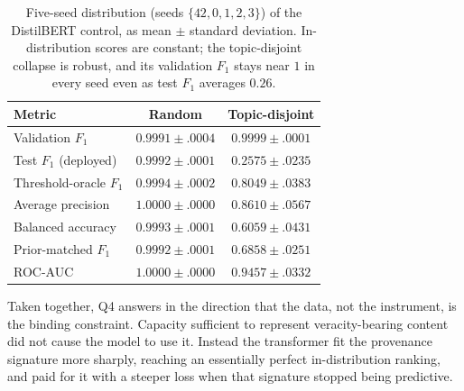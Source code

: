 \documentclass[conference]{IEEEtran}
\newcommand{\Fone}{$F_1$}
\begin{document}
\begin{table}[t]
\centering
\caption{Five-seed distribution (seeds $\{42,0,1,2,3\}$) of the DistilBERT
control, as mean $\pm$ standard deviation. In-distribution scores are constant;
the topic-disjoint collapse is robust, and its validation \Fone{} stays near $1$
in every seed even as test \Fone{} averages $0.26$.}
\label{tab:multiseed}
\footnotesize
\setlength{\tabcolsep}{3.4pt}
\begin{tabular}{@{}lcc@{}}
\toprule
Metric & Random & Topic-disjoint\\
\midrule
Validation \Fone{}          & $0.9991 \pm .0004$ & $0.9999 \pm .0001$\\
Test \Fone{} (deployed)     & $0.9992 \pm .0001$ & $0.2575 \pm .0235$\\
Threshold-oracle \Fone{}    & $0.9994 \pm .0002$ & $0.8049 \pm .0383$\\
Average precision           & $1.0000 \pm .0000$ & $0.8610 \pm .0567$\\
Balanced accuracy           & $0.9993 \pm .0001$ & $0.6059 \pm .0431$\\
Prior-matched \Fone{}       & $0.9992 \pm .0001$ & $0.6858 \pm .0251$\\
ROC-AUC                     & $1.0000 \pm .0000$ & $0.9457 \pm .0332$\\
\bottomrule
\end{tabular}
\end{table}

Taken together, Q4 answers in the direction that the data, not the instrument,
is the binding constraint. Capacity sufficient to represent veracity-bearing
content did not cause the model to use it. Instead the transformer fit the
provenance signature more sharply, reaching an essentially perfect
in-distribution ranking, and paid for it with a steeper loss when that signature
stopped being predictive.
\end{document}
